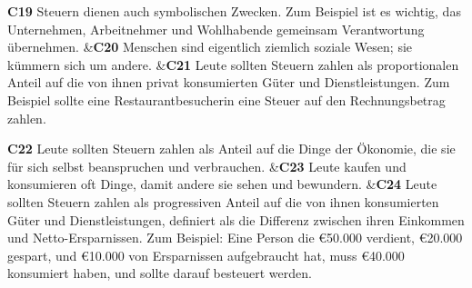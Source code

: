 \documentclass[
		11pt,
		a4paper,
		openright,
		oneside,
		ngerman
	]
	{book}
\begin{document}
\begin{longtabu}[htpb]
\textbf{C19} %
		Steuern dienen auch symbolischen Zwecken.
		Zum Beispiel ist es wichtig, das Unternehmen, Arbeitnehmer und Wohlhabende gemeinsam Verantwortung übernehmen.
&\textbf{C20}
		Menschen sind eigentlich ziemlich soziale Wesen; sie kümmern sich um andere.
&\textbf{C21} %
		Leute sollten Steuern zahlen als proportionalen Anteil auf die von ihnen privat konsumierten Güter und Dienstleistungen.
		Zum Beispiel sollte eine Restaurantbesucherin eine Steuer auf den Rechnungsbetrag zahlen.
\\

\midrule

\textbf{C22} %
		Leute sollten Steuern zahlen als Anteil auf die Dinge der Ökonomie, die sie für sich selbst beanspruchen und verbrauchen.
&\textbf{C23} %
		Leute kaufen und konsumieren oft Dinge, damit andere sie sehen und bewundern.
&\textbf{C24} %
		Leute sollten Steuern zahlen als progressiven Anteil auf die von ihnen konsumierten Güter und Dienstleistungen, definiert als die Differenz zwischen ihren Einkommen und Netto-Ersparnissen.
		Zum Beispiel: Eine Person die \euro 50.000 verdient, \euro 20.000 gespart, und \euro 10.000 von Ersparnissen aufgebraucht hat, muss \euro 40.000 konsumiert haben, und sollte darauf besteuert werden.
\\

\midrule


\end{longtabu}
\end{document}
